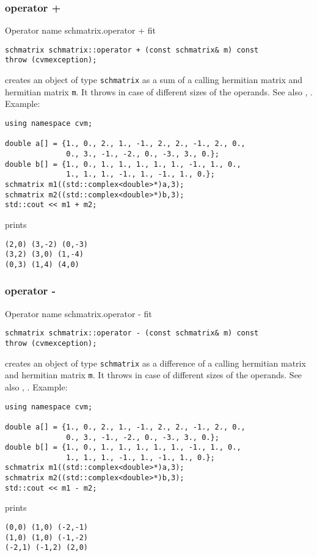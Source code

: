 \subsubsection{operator +}
Operator%
\pdfdest name {schmatrix.operator +} fit
\begin{verbatim}
schmatrix schmatrix::operator + (const schmatrix& m) const
throw (cvmexception);
\end{verbatim}
creates an object of type \verb"schmatrix" as a sum of
a calling hermitian matrix and  hermitian matrix \verb"m".
It throws  
in case of different sizes 
of the operands.
See also , .
Example:
\begin{Verbatim}
using namespace cvm;

double a[] = {1., 0., 2., 1., -1., 2., 2., -1., 2., 0.,
              0., 3., -1., -2., 0., -3., 3., 0.};
double b[] = {1., 0., 1., 1., 1., 1., 1., -1., 1., 0.,
              1., 1., 1., -1., 1., -1., 1., 0.};
schmatrix m1((std::complex<double>*)a,3);
schmatrix m2((std::complex<double>*)b,3);
std::cout << m1 + m2;
\end{Verbatim}
prints
\begin{Verbatim}
(2,0) (3,-2) (0,-3)
(3,2) (3,0) (1,-4)
(0,3) (1,4) (4,0)
\end{Verbatim}
\newpage



\subsubsection{operator -}
Operator%
\pdfdest name {schmatrix.operator -} fit
\begin{verbatim}
schmatrix schmatrix::operator - (const schmatrix& m) const
throw (cvmexception);
\end{verbatim}
creates an object of type \verb"schmatrix" as a difference of
a calling hermitian matrix and  hermitian matrix \verb"m".
It throws  
in case of different sizes 
of the operands.
See also , .
Example:
\begin{Verbatim}
using namespace cvm;

double a[] = {1., 0., 2., 1., -1., 2., 2., -1., 2., 0.,
              0., 3., -1., -2., 0., -3., 3., 0.};
double b[] = {1., 0., 1., 1., 1., 1., 1., -1., 1., 0.,
              1., 1., 1., -1., 1., -1., 1., 0.};
schmatrix m1((std::complex<double>*)a,3);
schmatrix m2((std::complex<double>*)b,3);
std::cout << m1 - m2;
\end{Verbatim}
prints
\begin{Verbatim}
(0,0) (1,0) (-2,-1)
(1,0) (1,0) (-1,-2)
(-2,1) (-1,2) (2,0)
\end{Verbatim}
\newpage




